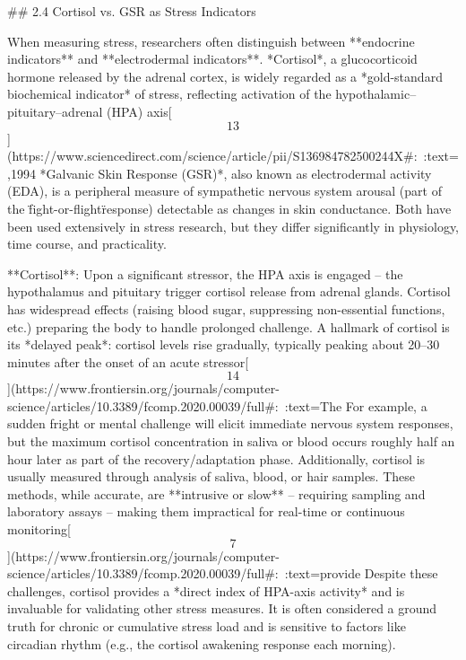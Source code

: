 \documentclass[12pt,a4paper]{article}
\begin{document}
## 2.4 Cortisol vs. GSR as Stress Indicators

When measuring stress, researchers often distinguish between **endocrine
indicators** and **electrodermal indicators**. *Cortisol*, a
glucocorticoid hormone released by the adrenal cortex, is widely
regarded as a *gold-standard biochemical indicator* of stress,
reflecting activation of the hypothalamic--pituitary--adrenal (HPA)
axis[\[13\]](https://www.sciencedirect.com/science/article/pii/S136984782500244X#:~:text=,1994%
*Galvanic Skin Response (GSR)*, also known as electrodermal activity
(EDA), is a peripheral measure of sympathetic nervous system arousal
(part of the \"fight-or-flight\" response) detectable as changes in skin
conductance. Both have been used extensively in stress research, but
they differ significantly in physiology, time course, and practicality.

**Cortisol**: Upon a significant stressor, the HPA axis is engaged --
the hypothalamus and pituitary trigger cortisol release from adrenal
glands. Cortisol has widespread effects (raising blood sugar,
suppressing non-essential functions, etc.) preparing the body to handle
prolonged challenge. A hallmark of cortisol is its *delayed peak*:
cortisol levels rise gradually, typically peaking about 20--30 minutes
after the onset of an acute
stressor[\[14\]](https://www.frontiersin.org/journals/computer-science/articles/10.3389/fcomp.2020.00039/full#:~:text=The%
For example, a sudden fright or mental challenge will elicit immediate
nervous system responses, but the maximum cortisol concentration in
saliva or blood occurs roughly half an hour later as part of the
recovery/adaptation phase. Additionally, cortisol is usually measured
through analysis of saliva, blood, or hair samples. These methods, while
accurate, are **intrusive or slow** -- requiring sampling and laboratory
assays -- making them impractical for real-time or continuous
monitoring[\[7\]](https://www.frontiersin.org/journals/computer-science/articles/10.3389/fcomp.2020.00039/full#:~:text=provide%
Despite these challenges, cortisol provides a *direct index of HPA-axis
activity* and is invaluable for validating other stress measures. It is
often considered a ground truth for chronic or cumulative stress load
and is sensitive to factors like circadian rhythm (e.g., the cortisol
awakening response each morning).
\end{document}
